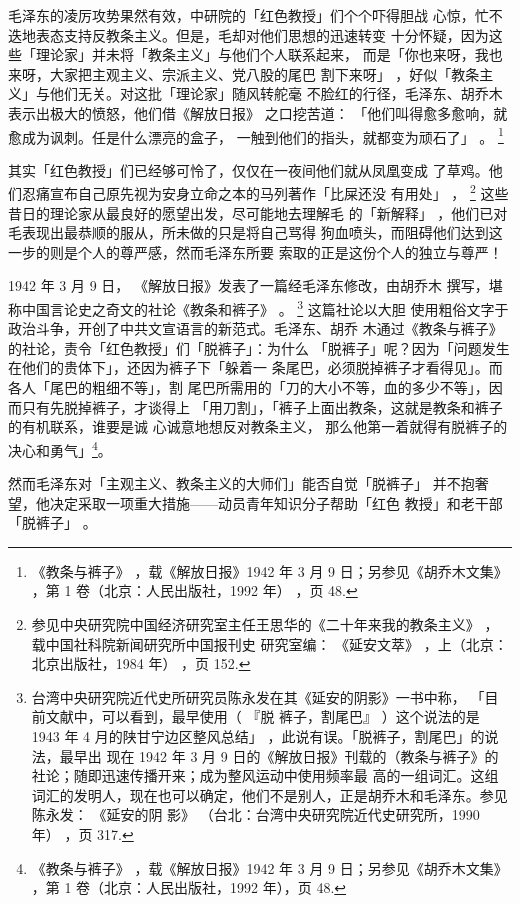 毛泽东的凌厉攻势果然有效，中研院的「红色教授」们个个吓得胆战
心惊，忙不迭地表态支持反教条主义。但是，毛却对他们思想的迅速转变
十分怀疑，因为这些「理论家」并未将「教条主义」与他们个人联系起来，
而是「你也来呀，我也来呀，大家把主观主义、宗派主义、党八股的尾巴
割下来呀」
，好似「教条主义」与他们无关。对这批「理论家」随风转舵毫
不脸红的行径，毛泽东、胡乔木表示出极大的愤怒，他们借《解放日报》
之口挖苦道：
「他们叫得愈多愈响，就愈成为讽刺。任是什么漂亮的盒子，
一触到他们的指头，就都变为顽石了」
。
\footnote{《教条与裤子》
，载《解放日报》1942 年 3 月 9 日；另参见《胡乔木文集》
，第 1 卷（北京：人民出版社，1992
年）
，页 48.}

其实「红色教授」们已经够可怜了，仅仅在一夜间他们就从凤凰变成
了草鸡。他们忍痛宣布自己原先视为安身立命之本的马列著作「比屎还没
有用处」
，
\footnote{参见中央研究院中国经济研究室主任王思华的《二十年来我的教条主义》
，载中国社科院新闻研究所中国报刊史
研究室编：
《延安文萃》
，上（北京：北京出版社，1984 年）
，页 152.}
这些昔日的理论家从最良好的愿望出发，尽可能地去理解毛
的「新解释」
，他们已对毛表现出最恭顺的服从，所未做的只是将自己骂得
狗血喷头，而阻碍他们达到这一步的则是个人的尊严感，然而毛泽东所要
索取的正是这份个人的独立与尊严！

 
 
1942 年 3 月 9 日，
《解放日报》发表了一篇经毛泽东修改，由胡乔木
撰写，堪称中国言论史之奇文的社论《教条和裤子》
。
\footnote{台湾中央研究院近代史所研究员陈永发在其《延安的阴影》一书中称，
「目前文献中，可以看到，最早使用（
『脱
裤子，割尾巴』
）这个说法的是 1943 年 4 月的陕甘宁边区整风总结」
，此说有误。「脱裤子，割尾巴」的说法，最早出
现在 1942 年 3 月 9 日的《解放日报》刊载的（教条与裤子》的社论；随即迅速传播开来；成为整风运动中使用频率最
高的一组词汇。这组词汇的发明人，现在也可以确定，他们不是别人，正是胡乔木和毛泽东。参见陈永发：
《延安的阴
影》
（台北：台湾中央研究院近代史研究所，1990 年）
，页 317.
}
这篇社论以大胆
使用粗俗文字于政治斗争，开创了中共文宣语言的新范式。毛泽东、胡乔
木通过《教条与裤子》的社论，责令「红色教授」们「脱裤子」：为什么
「脱裤子」呢？因为「问题发生在他们的贵体下」，还因为裤子下「躲着一
条尾巴，必须脱掉裤子才看得见」。而各人「尾巴的粗细不等」，割
尾巴所需用的「刀的大小不等，血的多少不等」，因而只有先脱掉裤子，才谈得上
「用刀割」，「裤子上面出教条，这就是教条和裤子的有机联系，谁要是诚
心诚意地想反对教条主义，
那么他第一着就得有脱裤子的决心和勇气」\footnote{《教条与裤子》
，载《解放日报》1942 年 3 月 9 日；另参见《胡乔木文集》
，第 1 卷（北京：人民出版社，1992
年），页 48.}。

然而毛泽东对「主观主义、教条主义的大师们」能否自觉「脱裤子」
并不抱奢望，他决定采取一项重大措施——动员青年知识分子帮助「红色
教授」和老干部「脱裤子」
。

